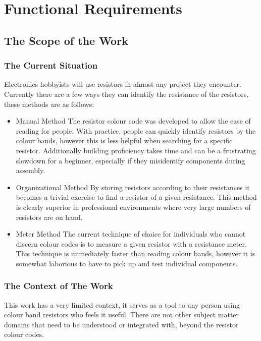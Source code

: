 \documentclass{article}
\begin{document}
\section{Functional Requirements}

\subsection{The Scope of the Work}

\subsubsection{The Current Situation}

Electronics hobbyists will use resistors in almost any project they encounter.
Currently there are a few ways they can identify the resistance of the resistors, these methods are as follows:
\begin{itemize}

\item Manual Method
\subitem The resistor colour code was developed to allow the ease of reading for people. 
With practice, people can quickly identify resistors by the colour bands, however this is less helpful when searching  for a specific resistor.
Additionally building proficiency takes time and can be a frustrating slowdown for a beginner, especially if they misidentify components during assembly.

\item Organizational Method
\subitem By storing resistors according to their resistances it becomes a trivial exercise to find a resistor of a given resistance.
This method is clearly superior in professional environments where very large numbers of resistors are on hand.

\item Meter Method
\subitem The current technique of choice for individuals who cannot discern colour codes is to measure a given resistor with a resistance meter.
This technique is immediately faster than reading colour bands, however it is somewhat laborious to have to pick up and test individual components.

\end{itemize}

\subsubsection{The Context of The Work}

This work has a very limited context, it serves as a tool to any person using colour band resistors who feels it useful.
There are not other subject matter domains that need to be understood or integrated with, beyond the resistor colour codes.
\end{document}
